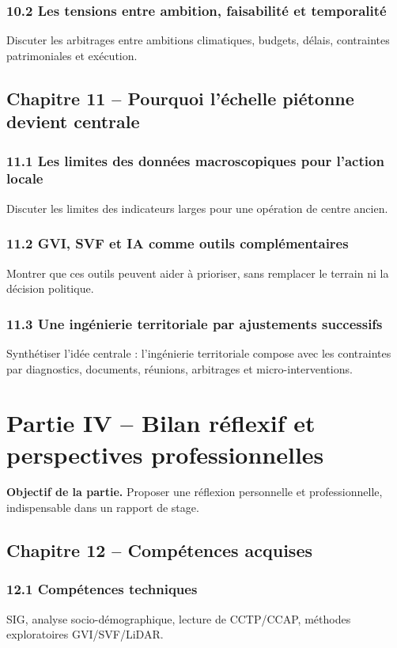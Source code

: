 \documentclass[11pt,a4paper]{article}
\begin{document}
\subsubsection{10.2 Les tensions entre ambition, faisabilité et temporalité}
Discuter les arbitrages entre ambitions climatiques, budgets, délais, contraintes patrimoniales et exécution.

\subsection{Chapitre 11 -- Pourquoi l'échelle piétonne devient centrale}

\subsubsection{11.1 Les limites des données macroscopiques pour l'action locale}
Discuter les limites des indicateurs larges pour une opération de centre ancien.

\subsubsection{11.2 GVI, SVF et IA comme outils complémentaires}
Montrer que ces outils peuvent aider à prioriser, sans remplacer le terrain ni la décision politique.

\subsubsection{11.3 Une ingénierie territoriale par ajustements successifs}
Synthétiser l'idée centrale : l'ingénierie territoriale compose avec les contraintes par diagnostics, documents, réunions, arbitrages et micro-interventions.

\section{Partie IV -- Bilan réflexif et perspectives professionnelles}

\textbf{Objectif de la partie.} Proposer une réflexion personnelle et professionnelle, indispensable dans un rapport de stage.

\subsection{Chapitre 12 -- Compétences acquises}

\subsubsection{12.1 Compétences techniques}
SIG, analyse socio-démographique, lecture de CCTP/CCAP, méthodes exploratoires GVI/SVF/LiDAR.
\end{document}
